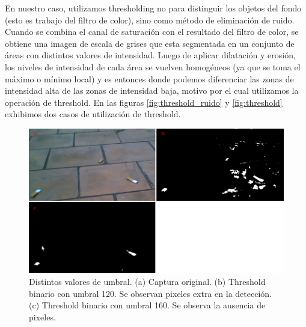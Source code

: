 \indent En nuestro caso, utilizamos thresholding no para distinguir los 
objetos del fondo (esto es trabajo del filtro de color), sino como 
método de eliminación de ruido. Cuando se combina el canal de 
saturación con el resultado del filtro de color, se obtiene una imagen 
de escala de grises que esta segmentada en un conjunto de áreas con 
distintos valores de intensidad. Luego de aplicar dilatación y 
erosión, los niveles de intensidad de cada área se vuelven 
homogéneos (ya que se toma el máximo o mínimo local) y es entonces 
donde podemos diferenciar las zonas de intensidad alta de las zonas de 
intensidad baja, motivo por el cual utilizamos la operación de 
threshold. En las figuras \ref{fig:threshold_ruido} y 
\ref{fig:threshold} exhibimos dos casos de utilización de threshold. 
\begin{figure}[tpb]
\begin{center}
  \includegraphics[scale=0.4]{figuras/threshold-dif.png}
\end{center}
  \caption{\small Distintos valores de umbral. (a) Captura original. 
  (b) Threshold binario con umbral 120. Se observan pixeles extra en 
  la detección. (c) Threshold binario con umbral 160. Se observa la 
  ausencia de pixeles. }
  \label{fig:thresh-dif}
\end{figure}


